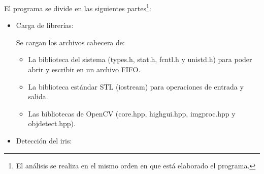 El programa se divide en las siguientes partes\footnote{El análisis se realiza en el mismo orden en que está elaborado el programa.}:

\begin{itemize}

    \item Carga de librerías: 



    
    Se cargan los archivos cabecera de:
    \begin{itemize}
        \item La biblioteca del sistema (types.h, stat.h, fcntl.h y unistd.h) para poder abrir y escribir en un archivo FIFO.
        \item La biblioteca estándar STL (iostream) para operaciones de entrada y salida.
        \item Las bibliotecas de OpenCV (core.hpp, highgui.hpp, imgproc.hpp y objdetect.hpp).
    \end{itemize}
    
\clearpage
   \item Detección del iris:

\end{itemize}
